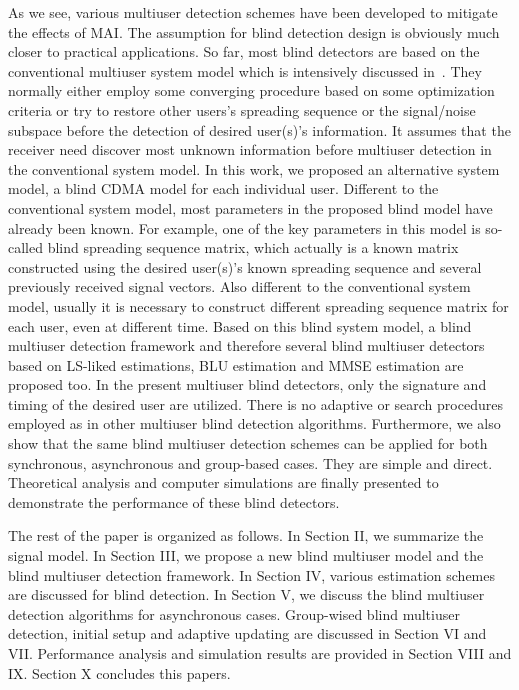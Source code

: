 \documentclass[a4paper,11pt,fleqn]{article}
\begin{document}
As we see, various multiuser detection schemes have been developed
to mitigate the effects of MAI. The assumption for blind detection
design is obviously much closer to practical applications. So far,
most blind detectors are based on the conventional multiuser
system model which is intensively discussed in~\cite{Verd98}. They
normally either employ some converging procedure based on some
optimization criteria or try to restore other users's spreading
sequence or the signal/noise subspace before the detection of
desired user(s)'s information. It assumes that the receiver need
discover most unknown information before multiuser detection in
the conventional system model. In this work, we proposed an
alternative system model, a blind CDMA model for each individual
user. Different to the conventional system model, most parameters
in the proposed blind model have already been known. For example,
one of the key parameters in this model is so-called blind
spreading sequence matrix, which actually is a known matrix
constructed using the desired user(s)'s known spreading sequence
and several previously received signal vectors. Also different to
the conventional system model, usually it is necessary to
construct different spreading sequence matrix for each user, even
at different time. Based on this blind system model, a blind
multiuser detection framework and therefore several blind
multiuser detectors based on LS-liked estimations, BLU estimation
and MMSE estimation are proposed too. In the present multiuser
blind detectors, only the signature and timing of the desired user
are utilized. There is no adaptive or search procedures employed
as in other multiuser blind detection algorithms. Furthermore, we
also show that the same blind multiuser detection schemes can be
applied for both synchronous, asynchronous and group-based cases.
They are simple and direct. Theoretical analysis and computer
simulations are finally presented to demonstrate the performance
of these blind detectors.

The rest of the paper is organized as follows. In Section II, we
summarize the signal model. In Section III, we propose a new blind
multiuser model and the blind multiuser detection framework. In
Section IV, various estimation schemes are discussed for blind
detection. In Section V, we discuss the blind multiuser detection
algorithms for asynchronous cases. Group-wised blind multiuser
detection, initial setup and adaptive updating are discussed in
Section VI and VII. Performance analysis and simulation results
are provided in Section VIII and IX. Section X concludes this
papers.
\end{document}
